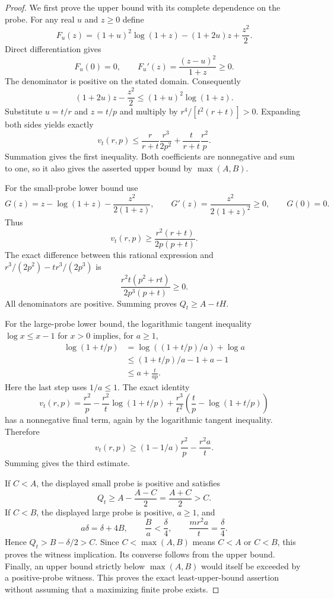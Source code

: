 \documentclass[11pt]{article}
\theoremstyle{definition}
\begin{document}
\begin{proof}
We first prove the upper bound with its complete dependence on the
probe. For any real $u$ and $z\ge0$ define
\[
 F_u(z)=(1+u)^2\log(1+z)-(1+2u)z+\frac{z^2}{2}.
\]
Direct differentiation gives
\[
 F_u(0)=0,\qquad F_u'(z)=\frac{(z-u)^2}{1+z}\ge0.
\]
The denominator is positive on the stated domain. Consequently
\[
 (1+2u)z-\frac{z^2}{2}\le(1+u)^2\log(1+z).
\]
Substitute $u=t/r$ and $z=t/p$ and multiply by
$r^4/[t^2(r+t)]>0$. Expanding both sides yields exactly
\[
 v_t(r,p)\le
 \frac{r}{r+t}\frac{r^3}{2p^2}
       +\frac{t}{r+t}\frac{r^2}{p}.
\]
Summation gives the first inequality. Both coefficients are
nonnegative and sum to one, so it also gives the asserted upper
bound by $\max(A,B)$.

For the small-probe lower bound use
\[
 G(z)=z-\log(1+z)-\frac{z^2}{2(1+z)},\qquad
 G'(z)=\frac{z^2}{2(1+z)^2}\ge0,\qquad G(0)=0.
\]
Thus
\[
 v_t(r,p)\ge\frac{r^2(r+t)}{2p(p+t)}.
\]
The exact difference between this rational expression and
$r^3/(2p^2)-tr^3/(2p^3)$ is
\[
 \frac{r^2t(p^2+rt)}{2p^3(p+t)}\ge0.
\]
All denominators are positive. Summing proves $Q_t\ge A-tH$.

For the large-probe lower bound, the logarithmic tangent inequality
$\log x\le x-1$ for $x>0$ implies, for $a\ge1$,
\[
 \begin{split}
 \log(1+t/p)
  &=\log((1+t/p)/a)+\log a\\
  &\le (1+t/p)/a-1+a-1\\
  &\le a+\frac{t}{ap}.
 \end{split}
\]
Here the last step uses $1/a\le1$. The exact identity
\[
 v_t(r,p)=\frac{r^2}{p}-\frac{r^2}{t}\log(1+t/p)
       +\frac{r^3}{t^2}
          \left(\frac tp-\log(1+t/p)\right)
\]
has a nonnegative final term, again by the logarithmic tangent
inequality. Therefore
\[
 v_t(r,p)\ge (1-1/a)\frac{r^2}{p}-\frac{r^2a}{t}.
\]
Summing gives the third estimate.

If $C<A$, the displayed small probe is positive and satisfies
\[
 Q_t\ge A-\frac{A-C}{2}=\frac{A+C}{2}>C.
\]
If $C<B$, the displayed large probe is positive, $a\ge1$, and
\[
 a\delta=\delta+4B,\qquad
 \frac Ba<\frac{\delta}{4},\qquad
 \frac{mr^2a}{t}=\frac{\delta}{4}.
\]
Hence $Q_t>B-\delta/2>C$. Since
$C<\max(A,B)$ means $C<A$ or $C<B$, this proves the witness
implication. Its converse follows from the upper bound.
Finally, an upper bound strictly below $\max(A,B)$ would itself
be exceeded by a positive-probe witness. This proves the exact
least-upper-bound assertion without assuming that a maximizing
finite probe exists.
\end{proof}
\end{document}
